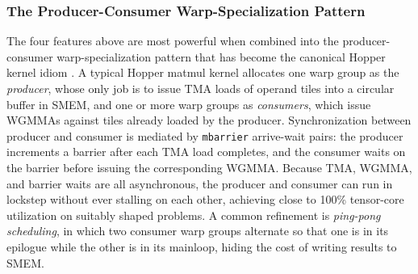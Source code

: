 \documentclass[10pt]{article}
\begin{document}
\subsubsection{The Producer-Consumer Warp-Specialization Pattern}
The four features above are most powerful when combined into the producer-consumer warp-specialization pattern that has become the canonical Hopper kernel idiom \citep{shah2024flashattention3,thakkar2023cutlass,colfax2024fa3}. A typical Hopper matmul kernel allocates one warp group as the \emph{producer}, whose only job is to issue TMA loads of operand tiles into a circular buffer in SMEM, and one or more warp groups as \emph{consumers}, which issue WGMMAs against tiles already loaded by the producer. Synchronization between producer and consumer is mediated by \texttt{mbarrier} arrive-wait pairs: the producer increments a barrier after each TMA load completes, and the consumer waits on the barrier before issuing the corresponding WGMMA. Because TMA, WGMMA, and barrier waits are all asynchronous, the producer and consumer can run in lockstep without ever stalling on each other, achieving close to 100\% tensor-core utilization on suitably shaped problems. A common refinement is \emph{ping-pong scheduling}, in which two consumer warp groups alternate so that one is in its epilogue while the other is in its mainloop, hiding the cost of writing results to SMEM.
\end{document}
